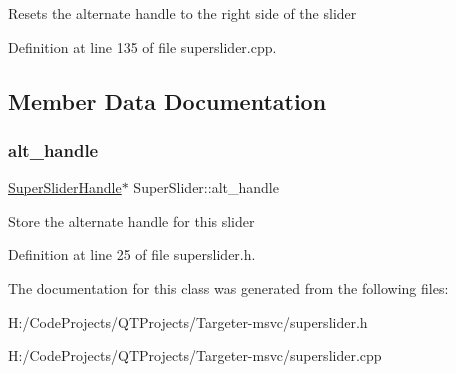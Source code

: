 Resets the alternate handle to the right side of the slider 

Definition at line 135 of file superslider.\+cpp.



\subsection{Member Data Documentation}
\mbox{\label{class_super_slider_ab9914dbeb1d49ddb7e4c0309477189a8}} 
\subsubsection{\texorpdfstring{alt\+\_\+handle}{alt\_handle}}
{\footnotesize\ttfamily \hyperlink{class_super_slider_handle}{Super\+Slider\+Handle}$\ast$ Super\+Slider\+::alt\+\_\+handle}

Store the alternate handle for this slider 

Definition at line 25 of file superslider.\+h.



The documentation for this class was generated from the following files\+:\begin{DoxyCompactItemize}
\item 
H\+:/\+Code\+Projects/\+Q\+T\+Projects/\+Targeter-\/msvc/superslider.\+h\item 
H\+:/\+Code\+Projects/\+Q\+T\+Projects/\+Targeter-\/msvc/superslider.\+cpp\end{DoxyCompactItemize}
